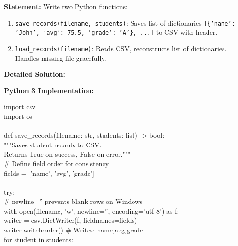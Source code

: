 \documentclass[11pt]{article}
\begin{document}
\begin{exoresolu}
\textbf{Statement:} Write two Python functions:
\begin{enumerate}
    \item \texttt{save\_records(filename, students)}: Saves list of dictionaries \texttt{[\{'name': 'John', 'avg': 75.5, 'grade': 'A'\}, ...]} to CSV with header.
    \item \texttt{load\_records(filename)}: Reads CSV, reconstructs list of dictionaries. Handles missing file gracefully.
\end{enumerate}
\tcblower
\textbf{Detailed Solution:}

\noindent\textbf{Python 3 Implementation:}
\begin{flushleft}
\ttfamily\small
import csv\\
import os\\
\mbox{}\\
def save\_records(filename: str, students: list) -> bool:\\
\hspace{1em}"""\hspace{0.5em}Saves student records to CSV.\\
\hspace{1em}Returns True on success, False on error.\hspace{0.5em}"""\\
\hspace{1em}\# Define field order for consistency\\
\hspace{1em}fields = ['name', 'avg', 'grade']\\
\mbox{}\\
\hspace{1em}try:\\
\hspace{2em}\# newline='' prevents blank rows on Windows\\
\hspace{2em}with open(filename, 'w', newline='', encoding='utf-8') as f:\\
\hspace{3em}writer = csv.DictWriter(f, fieldnames=fields)\\
\hspace{3em}writer.writeheader() \hspace{1em}\# Writes: name,avg,grade\\
\hspace{3em}for student in students:\\

\end{flushleft}
\end{exoresolu}
\end{document}
